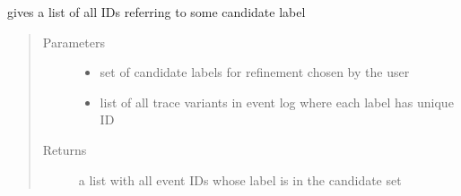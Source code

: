 \documentclass[letterpaper,10pt,english]{sphinxmanual}
\begin{document}
\begin{fulllineitems}
\label{\detokenize{cost function:costFunction.mappings.positionsOfCandidates}}
gives a list of all IDs referring to some candidate label
\begin{quote}\begin{description}
\item[{Parameters}] \leavevmode\begin{itemize}
\item {} 
 \textendash{} set of candidate labels for refinement chosen by the user

\item {} 
 \textendash{} list of all trace variants in event log where each label has unique ID

\end{itemize}

\item[{Returns}] \leavevmode
a list with all event IDs whose label is in the candidate set

\end{description}\end{quote}

\end{fulllineitems}

\end{document}
